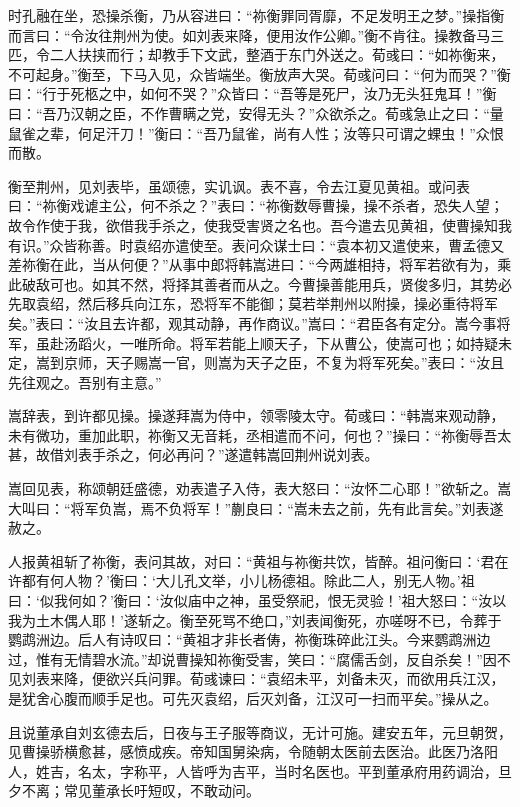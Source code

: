 时孔融在坐，恐操杀衡，乃从容进曰：“祢衡罪同胥靡，不足发明王之梦。”操指衡而言曰：“令汝往荆州为使。如刘表来降，便用汝作公卿。”衡不肯往。操教备马三匹，令二人扶挟而行；却教手下文武，整酒于东门外送之。荀彧曰：“如祢衡来，不可起身。”衡至，下马入见，众皆端坐。衡放声大哭。荀彧问曰：“何为而哭？”衡曰：“行于死柩之中，如何不哭？”众皆曰：“吾等是死尸，汝乃无头狂鬼耳！”衡曰：“吾乃汉朝之臣，不作曹瞒之党，安得无头？”众欲杀之。荀彧急止之曰：“量鼠雀之辈，何足汗刀！”衡曰：“吾乃鼠雀，尚有人性；汝等只可谓之蜾虫！”众恨而散。

衡至荆州，见刘表毕，虽颂德，实讥讽。表不喜，令去江夏见黄祖。或问表曰：“祢衡戏谑主公，何不杀之？”表曰：“祢衡数辱曹操，操不杀者，恐失人望；故令作使于我，欲借我手杀之，使我受害贤之名也。吾今遣去见黄祖，使曹操知我有识。”众皆称善。时袁绍亦遣使至。表问众谋士曰：“袁本初又遣使来，曹孟德又差祢衡在此，当从何便？”从事中郎将韩嵩进曰：“今两雄相持，将军若欲有为，乘此破敌可也。如其不然，将择其善者而从之。今曹操善能用兵，贤俊多归，其势必先取袁绍，然后移兵向江东，恐将军不能御；莫若举荆州以附操，操必重待将军矣。”表曰：“汝且去许都，观其动静，再作商议。”嵩曰：“君臣各有定分。嵩今事将军，虽赴汤蹈火，一唯所命。将军若能上顺天子，下从曹公，使嵩可也；如持疑未定，嵩到京师，天子赐嵩一官，则嵩为天子之臣，不复为将军死矣。”表曰：“汝且先往观之。吾别有主意。”

嵩辞表，到许都见操。操遂拜嵩为侍中，领零陵太守。荀彧曰：“韩嵩来观动静，未有微功，重加此职，祢衡又无音耗，丞相遣而不问，何也？”操曰：“祢衡辱吾太甚，故借刘表手杀之，何必再问？”遂遣韩嵩回荆州说刘表。

嵩回见表，称颂朝廷盛德，劝表遣子入侍，表大怒曰：“汝怀二心耶！”欲斩之。嵩大叫曰：“将军负嵩，焉不负将军！”蒯良曰：“嵩未去之前，先有此言矣。”刘表遂赦之。

人报黄祖斩了祢衡，表问其故，对曰：“黄祖与祢衡共饮，皆醉。祖问衡曰：‘君在许都有何人物？’衡曰：‘大儿孔文举，小儿杨德祖。除此二人，别无人物。’祖曰：‘似我何如？’衡曰：‘汝似庙中之神，虽受祭祀，恨无灵验！’祖大怒曰：“汝以我为土木偶人耶！’遂斩之。衡至死骂不绝口，”刘表闻衡死，亦嗟呀不已，令葬于鹦鹉洲边。后人有诗叹曰：“黄祖才非长者俦，祢衡珠碎此江头。今来鹦鹉洲边过，惟有无情碧水流。”却说曹操知祢衡受害，笑曰：“腐儒舌剑，反自杀矣！”因不见刘表来降，便欲兴兵问罪。荀彧谏曰：“袁绍未平，刘备未灭，而欲用兵江汉，是犹舍心腹而顺手足也。可先灭袁绍，后灭刘备，江汉可一扫而平矣。”操从之。

且说董承自刘玄德去后，日夜与王子服等商议，无计可施。建安五年，元旦朝贺，见曹操骄横愈甚，感愤成疾。帝知国舅染病，令随朝太医前去医治。此医乃洛阳人，姓吉，名太，字称平，人皆呼为吉平，当时名医也。平到董承府用药调治，旦夕不离；常见董承长吁短叹，不敢动问。

